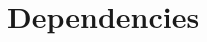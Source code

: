\documentclass[10pt, a4paper, final]{article}
\begin{document}
\newcommand{\cmmnsmath}{& commons math 	& 2.1 & yes	&	\\}
\newcommand{\cmmnsconf}{& commons configuration 	& 1.9 & yes	&	\\}
\newcommand{\cmmnslang}{& commons lang 	& 2.6 & yes	&	\\}
\newcommand{\cmmnslog}{& commons log & 1.1.1 & yes	&	\\}


%
%
%
% 
%














\section*{Dependencies}
\end{document}
